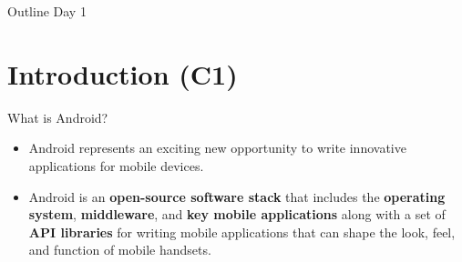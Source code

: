 \begin{frame}[t,plain]
\titlepage
\end{frame}

\begin{frame}{Outline Day 1}
    \tableofcontents
\end{frame}


\section{Introduction (C1)}
\begin{frame}{What is Android?}
\begin{itemize}
\item Android represents an exciting new
opportunity to write innovative applications for
mobile devices.
\item Android is an \textbf{open-source software stack} that
includes the \textbf{operating system}, \textbf{middleware}, and \textbf{key mobile applications} along
with a set of \textbf{API libraries} for writing mobile applications that can shape the
look, feel, and function of mobile handsets.
\end{itemize}
\end{frame}

